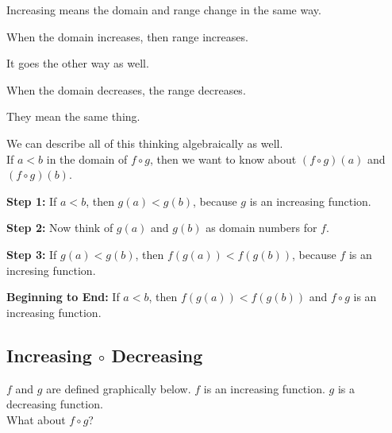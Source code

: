 \documentclass{ximera}
\begin{document}
\begin{warning}

Increasing means the domain and range change in the same way.

When the domain increases, then range increases.

It goes the other way as well.

When the domain decreases, the range decreases.

They mean the same thing.


\end{warning}



We can describe all of this thinking algebraically as well. \\


If $a < b$ in the domain of $f \circ g$, then we want to know about $(f \circ g)(a)$  and $(f \circ g)(b)$.



\textbf{Step 1:}  If $a < b$, then $g(a) < g(b)$, because $g$ is an increasing function.


\textbf{Step 2:}  Now think of $g(a)$  and $g(b)$ as domain numbers for $f$.


\textbf{Step 3:}  If $g(a) < g(b)$, then $f(g(a)) < f(g(b))$, because $f$ is an incresing function.


\textbf{Beginning to End:} If $a < b$, then $f(g(a)) < f(g(b))$ and $f \circ g$ is an increasing function.




















\subsection{Increasing $\circ$ Decreasing}



$f$ and $g$ are defined graphically below.  $f$ is an increasing function.  $g$ is a decreasing function. \\

What about $f \circ g$? \\
\end{document}
